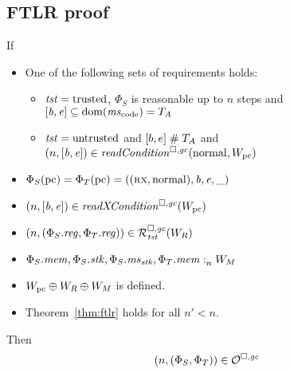 \subsection{FTLR proof}

\begin{lemma}
  \label{lem:ftlr-internal-lemma}
  If
  \begin{itemize}
  \item One of the following sets of requirements holds:
    \begin{itemize}
    \item $\mathit{tst} = \mathrm{trusted}$, $\Phi_S$ is reasonable up to $n$ steps and $[\baddr,\eaddr] \subseteq \dom(\mscode) = \ta$
    \item $\mathit{tst} = \mathrm{untrusted}$ and $[b,e] \mathrel{\#} T_{A}$ and $\npair{[\baddr,\eaddr]} \in \readCond{\normal,W_\pcreg}$
    \end{itemize}
  \item $\Phi_S(\mathrm{pc}) = \Phi_T(\mathrm{pc}) = ((\textsc{rx},\mathrm{normal}),\mathit{b},\mathit{e},\_)$
  \item $\npair{[\baddr,\eaddr]} \in \xReadCond{W_\pcreg}$
  \item $\npair{(\Phi_S.\reg,\Phi_T.\reg)} \in \lrrg{\trust}(W_R)$
  \item $\Phi_S.\mathit{mem},\Phi_S.\mathit{stk},\Phi_S.\mathit{ms}_{\mathit{stk}},\Phi_T.\mathit{mem} :_{n}^{}W_M$
  \item $W_{\mathrm{pc}} \oplus W_R \oplus W_M$ is defined.
  \item Theorem~\ref{thm:ftlr} holds for all $n' < n$.
  \end{itemize}
  Then
  \[
    \left(n,(\Phi_S,\Phi_T)\right) \in \mathcal{O}^{\square,\mathit{gc}}
  \]
\end{lemma}
